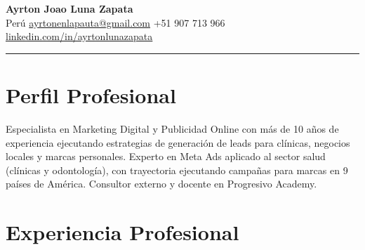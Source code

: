 \documentclass[11pt,letterpaper]{article}
\begin{document}
\begin{center}
  {\LARGE\bfseries Ayrton Joao Luna Zapata} \\[4pt]
  \enspace Perú
  \quad{}\enspace \href{mailto:ayrtonenlapauta@gmail.com}{ayrtonenlapauta@gmail.com}
  \quad{}\enspace +51 907 713 966
  \\[2pt]
  \enspace \href{https://www.linkedin.com/in/ayrtonlunazapata/}{linkedin.com/in/ayrtonlunazapata}
\end{center}

\vspace{-0.4em}
\noindent\rule{\textwidth}{0.8pt}
\vspace{-0.8em}

\section{Perfil Profesional}

\noindent Especialista en Marketing Digital y Publicidad Online con más de 10 años de experiencia ejecutando estrategias de generación de leads para clínicas, negocios locales y marcas personales. Experto en Meta Ads aplicado al sector salud (clínicas y odontología), con trayectoria ejecutando campañas para marcas en 9 países de América. Consultor externo y docente en Progresivo Academy.

\section{Experiencia Profesional}
\end{document}
